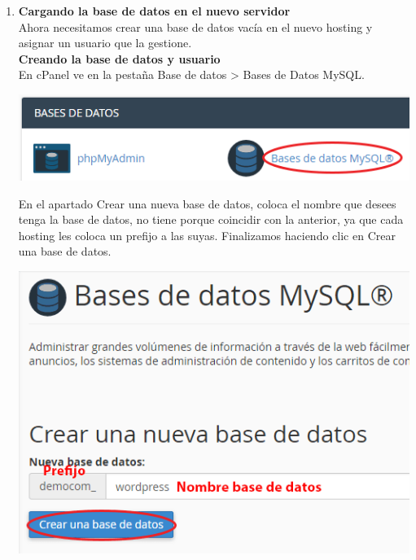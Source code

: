 \begin{enumerate}
		\newpage
		
		\item \textbf{Cargando la base de datos en el nuevo servidor}\\
		
		Ahora necesitamos crear una base de datos vacía en el nuevo hosting y asignar un usuario que la gestione.\\
		
		\textbf{Creando la base de datos y usuario}\\
		
		En cPanel ve en la pestaña Base de datos > Bases de Datos MySQL.
		
		\begin{center}
			\includegraphics[scale=0.5]{image/migra9.png}
		\end{center}
		
		En el apartado Crear una nueva base de datos, coloca el nombre que desees tenga la base de datos, no tiene porque coincidir con la anterior, ya que cada hosting les coloca un prefijo a las suyas. Finalizamos haciendo clic en Crear una base de datos.
		
		\begin{center}
			\includegraphics[scale=0.5]{image/migra10.png}
		\end{center}
		

\end{enumerate}
